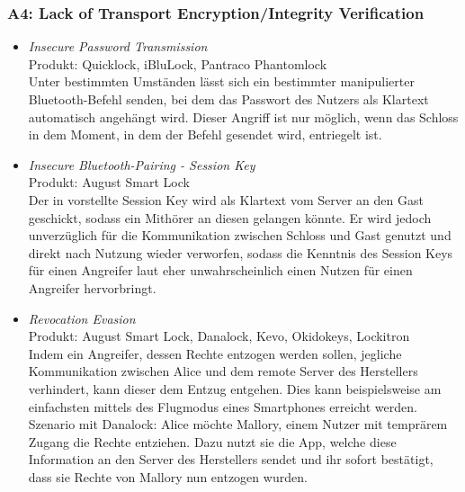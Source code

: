     \subsubsection*{A4: Lack of Transport Encryption/Integrity Verification}
        \begin{itemize}[leftmargin=0cm,label={}]
            \item \emph{Insecure Password Transmission}\cite{Rose2016}\label{vuln:pwdtrns}\\
                Produkt: Quicklock, iBluLock, Pantraco Phantomlock\\
                Unter bestimmten Umständen lässt sich ein bestimmter manipulierter Bluetooth-Befehl senden, bei dem das Passwort des Nutzers als Klartext automatisch angehängt wird.
    	        Dieser Angriff ist nur möglich, wenn das Schloss in dem Moment, in dem der Befehl gesendet wird, entriegelt ist.
            \item \emph{Insecure Bluetooth-Pairing - Session Key}\cite{Fuller2017}\label{vuln:blesk}\\
                Produkt: August Smart Lock\\
                Der in  vorstellte Session Key wird als Klartext vom Server an den Gast geschickt, sodass ein Mithörer an diesen gelangen könnte.
    	        Er wird jedoch unverzüglich für die Kommunikation zwischen Schloss und Gast genutzt und direkt nach Nutzung wieder verworfen, sodass die Kenntnis des Session Keys für einen Angreifer laut \citeauthor{Fuller2017}\cite{Fuller2017} eher unwahrscheinlich einen Nutzen für einen Angreifer hervorbringt.
	        \item \emph{Revocation Evasion}\cite{Fuller2017,Ho2016}\label{vuln:revocationevasion}\\
                Produkt: August Smart Lock, Danalock, Kevo, Okidokeys, Lockitron\\
                Indem ein Angreifer, dessen Rechte entzogen werden sollen, jegliche Kommunikation zwischen Alice und dem remote Server des Herstellers verhindert, kann dieser dem Entzug entgehen.
                Dies kann beispielsweise am einfachsten mittels des Flugmodus eines Smartphones erreicht werden.\\
                Szenario mit Danalock: Alice möchte Mallory, einem Nutzer mit temprärem Zugang die Rechte entziehen. 
                Dazu nutzt sie die App, welche diese Information an den Server des Herstellers sendet und ihr sofort bestätigt, dass sie Rechte von Mallory nun entzogen wurden. 

\end{itemize}
